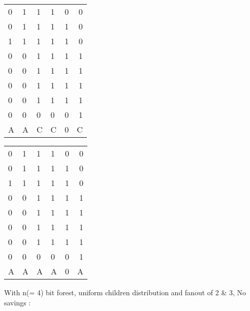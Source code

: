 \begin{multicols}{2}

	\begin{tabular}{ l l |l l c r }
	  
	  0 & 1 & 1 & 1 & 0 & 0 \\
	  0 & 1 & 1 & 1 & 1 & 0 \\
	  1 & 1 & 1 & 1 & 1 & 0 \\
	  \hline
	  0 & 0 & 1 & 1 & 1 & 1 \\
	  0 & 0 & 1 & 1 & 1 & 1 \\
	  0 & 0 & 1 & 1 & 1 & 1 \\
	  0 & 0 & 1 & 1 & 1 & 1 \\
	  0 & 0 & 0 & 0 & 0 & 1 \\
	  \hline	
	  A & A & C & C & 0 & C \\
	
	\end{tabular}
\columnbreak{|}
	\begin{tabular}{ l l | l l c r }
	  0 & 1 & 1 & 1 & 0 & 0 \\
	  0 & 1 & 1 & 1 & 1 & 0 \\
	  1 & 1 & 1 & 1 & 1 & 0 \\
	  \hline
	  0 & 0 & 1 & 1 & 1 & 1 \\
	  0 & 0 & 1 & 1 & 1 & 1 \\
	  0 & 0 & 1 & 1 & 1 & 1 \\
	  0 & 0 & 1 & 1 & 1 & 1 \\
	  0 & 0 & 0 & 0 & 0 & 1 \\
	  \hline
	  A & A & A & A & 0 & A\\

	\end{tabular}

\end{multicols}

With n(= 4) bit forest, uniform children distribution and fanout of 2 \& 3, No savings :

